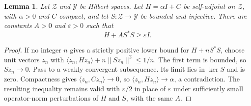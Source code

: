 \documentclass[11pt]{amsart}
\numberwithin{equation}{section}
\newtheorem{lemma}{Lemma}[section]
\newcommand{\ip}[2]{\langle #1,#2\rangle}
\newcommand{\norm}[1]{\lVert #1\rVert}
\begin{document}
\begin{lemma}\label{lem:coercive}
Let $\mathcal Z$ and $\mathcal Y$ be Hilbert spaces. Let
$H=\alpha I+C$ be self-adjoint on $\mathcal Z$, with $\alpha>0$
and $C$ compact, and let $S:\mathcal Z\to\mathcal Y$ be bounded
and injective. There are constants $A>0$ and $\varepsilon>0$ such that
\[
 H+A S^*S\ge\varepsilon I.
\]
\end{lemma}
\begin{proof}
If no integer $n$ gives a strictly positive lower bound for
$H+nS^*S$, choose unit vectors $z_n$ with
$\ip{z_n}{Hz_n}+n\norm{Sz_n}^2\le1/n$.
The first term is bounded, so $Sz_n\to0$. Pass to a weakly convergent
subsequence. Its limit lies in $\ker S$ and is zero. Compactness gives
$\ip{z_n}{Cz_n}\to0$, so $\ip{z_n}{Hz_n}\to\alpha$, a contradiction.
The resulting inequality remains valid with $\varepsilon/2$ in
place of $\varepsilon$ under sufficiently small operator-norm
perturbations of $H$ and $S$, with the same $A$.
\end{proof}
\end{document}
